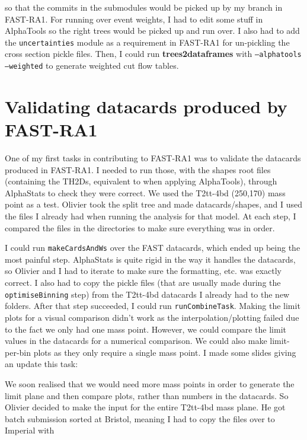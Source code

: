 so that the commits in the submodules would be picked up by my branch in FAST-RA1. For running over event weights, I had to edit some stuff in AlphaTools so the right trees would be picked up and run over. I also had to add the \texttt{uncertainties} module as a requirement in FAST-RA1 for un-pickling the cross section pickle files. Then, I could run \textbf{trees2dataframes} with \texttt{--alphatools --weighted} to generate weighted cut flow tables.


\section{Validating datacards produced by FAST-RA1}

One of my first tasks in contributing to FAST-RA1 was to validate the datacards produced in FAST-RA1. I needed to run those, with the shapes root files (containing the TH2Ds, equivalent to when applying AlphaTools), through AlphaStats to check they were correct. We used the T2tt-4bd (250,170) mass point as a test. Olivier took the split tree and made datacards/shapes, and I used the files I already had when running the analysis for that model. At each step, I compared the files in the directories to make sure everything was in order.

I could run \texttt{makeCardsAndWs} over the FAST datacards, which ended up being the most painful step. AlphaStats is quite rigid in the way it handles the datacards, so Olivier and I had to iterate to make sure the formatting, etc. was exactly correct. I also had to copy the pickle files (that are usually made during the \texttt{optimiseBinning} step) from the T2tt-4bd datacards I already had to the new folders. After that step succeeded, I could run \texttt{runCombineTask}. Making the limit plots for a visual comparison didn't work as the interpolation/plotting failed due to the fact we only had one mass point. However, we could compare the limit values in the datacards for a numerical comparison. We could also make limit-per-bin plots as they only require a single mass point. I made some slides giving an update this task: %

We soon realised that we would need more mass points in order to generate the limit plane and then compare plots, rather than numbers in the datacards. So Olivier decided to make the input for the entire T2tt-4bd mass plane. He got batch submission sorted at Bristol, meaning I had to copy the files over to Imperial with


